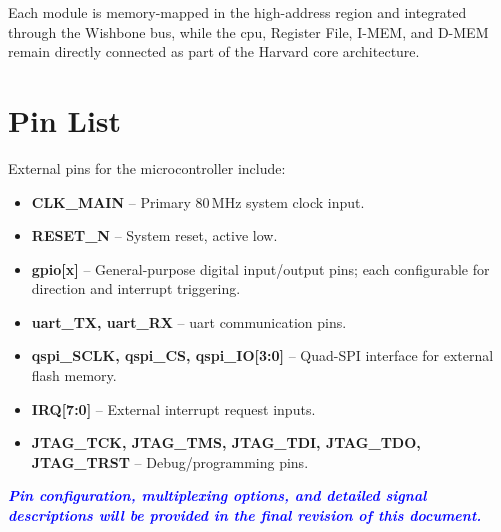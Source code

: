 \begin{itemize}
            Each module is memory-mapped in the high-address region and integrated through
            the Wishbone bus, while the \gls{cpu}, Register File, \gls{I-MEM}, and
            \gls{D-MEM} remain directly connected as part of the \gls{Harvard} core
            architecture.

            \section{Pin List}
            External pins for the microcontroller include:

            \begin{itemize}
                  \item \textbf{CLK\_MAIN} – Primary 80\,MHz system clock input.
                  \item \textbf{RESET\_N} – System reset, active low.
                  \item \textbf{\gls{gpio}[x]} – General-purpose digital input/output pins; each configurable for direction and interrupt triggering.
                  \item \textbf{\gls{uart}\_TX, \gls{uart}\_RX} – \gls{uart} communication pins.
                  \item \textbf{\gls{qspi}\_SCLK, \gls{qspi}\_CS, \gls{qspi}\_IO[3:0]} – Quad-SPI interface for external flash memory.
                  \item \textbf{\gls{IRQ}[7:0]} – External interrupt request inputs.
                  \item \textbf{JTAG\_TCK, JTAG\_TMS, JTAG\_TDI, JTAG\_TDO, JTAG\_TRST} – Debug/programming pins.
            \end{itemize}

            \textcolor{blue}{\textbf{\textit{Pin configuration, multiplexing options, and detailed signal descriptions will be provided in the final revision of this document.}}}

\end{itemize}
